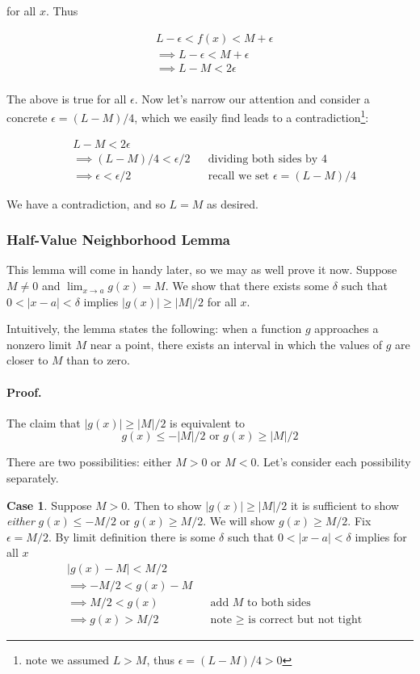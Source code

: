 for all $x$. Thus

\begin{align*}
    &L-\epsilon<f(x)<M+\epsilon\\
    &\implies L-\epsilon<M+\epsilon\\
    &\implies L-M<2\epsilon\\
\end{align*}

The above is true for all $\epsilon$. Now let's narrow our attention and
consider a concrete $\epsilon=(L-M)/4$, which we easily find leads to a
contradiction\footnote{note we assumed $L>M$, thus $\epsilon=(L-M)/4>0$}:

\begin{align*}
    &L-M<2\epsilon\\
    &\implies (L-M)/4<\epsilon/2&&\text{dividing both sides by 4}\\
    &\implies \epsilon<\epsilon/2&&\text{recall we set $\epsilon=(L-M)/4$}
\end{align*}

We have a contradiction, and so $L=M$ as desired.

\subsubsection*{Half-Value Neighborhood Lemma} \label{subsubsec:half-value-lemma}

This lemma will come in handy later, so we may as well prove it now.
Suppose $M\neq0$ and $\lim_{x\to a}g(x)=M$. We show that there exists some
$\delta$ such that $0<|x-a|<\delta$ implies $|g(x)|\geq|M|/2$ for all $x$.

\vs

Intuitively, the lemma states the following: when a function $g$
approaches a nonzero limit $M$ near a point, there exists an interval
in which the values of $g$ are closer to $M$ than to zero.

\paragraph{Proof.} The claim that $|g(x)|\geq|M|/2$ is equivalent to
\[g(x)\leq-|M|/2 \text{\ \ \ or\ \ \ }g(x)\geq|M|/2\]

There are two possibilities: either $M>0$ or $M<0$. Let's consider
each possibility separately.

\vs

\textbf{Case 1}. Suppose $M>0$. Then to show $|g(x)|\geq|M|/2$ it is
sufficient to show \textit{either} $g(x)\leq-M/2$ or $g(x)\geq M/2$. We will
show $g(x)\geq M/2$. Fix $\epsilon=M/2$. By limit definition there is some
$\delta$ such that $0<|x-a|<\delta$ implies for all $x$
\begin{align*}
    &|g(x)-M|<M/2\\
    &\implies -M/2<g(x)-M\\
    &\implies M/2<g(x)&&\text{add $M$ to both sides}\\
    &\implies g(x)>M/2&&\text{note $\geq$ is correct but not tight}
\end{align*}

